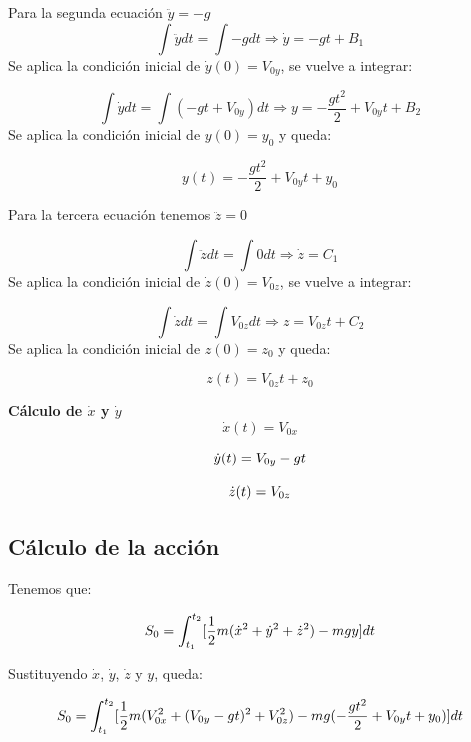 \documentclass{article}
\begin{document}
Para la segunda ecuación $\ddot{y}=-g$
\[
\int\ddot{y}dt=\int-gdt \Longrightarrow \dot{y}=-gt + B_1
\]
Se aplica la condición inicial de $\dot{y} (0)=V_{0y}$, se vuelve a integrar:

\[
\int \dot{y} dt = \int( -gt+ V_{0y}) dt \Longrightarrow y = -\frac{gt^2}{2} + V_{0y}t + B_2
\]
Se aplica la condición inicial de $y(0)=y_{0}$ y queda:

\begin{equation}
   y(t) = -\frac{gt^2}{2} + V_{0y}t + y_0
\end{equation}

Para la tercera ecuación tenemos $\ddot{z}=0$

\[
\int \ddot{z} dt = \int 0 dt \Longrightarrow \dot{z} = C_1
\]
Se aplica la condición inicial de $\dot{z} (0)=V_{0z}$, se vuelve a integrar:

\[
\int \dot{z} dt = \int V_{0z} dt \Longrightarrow z = V_{0z} t + C_2
\]
Se aplica la condición inicial de $z(0)=z_{0}$ y queda:

\begin{equation}
   z(t) = V_{0z} t + z_0
\end{equation}

\textbf{Cálculo de $\dot{x}$ y $\dot{y}$}
\begin{equation}
    \dot{x}(t)= V_{0x}
\end{equation}

\begin{equation}
\centering
    \dot{y}(t)= V_{0y} - gt
\end{equation}

\begin{equation}
\centering
    \dot{z}(t)= V_{0z}
\end{equation}

\subsection*{Cálculo de la acción}
Tenemos que:

\begin{equation}
\centering
    S_0= \int_{t_1}^{t_2} [\frac{1}{2}m( \dot{x}^2 + \dot{y}^2 + \dot{z}^2 ) - mgy]dt
\end{equation}

Sustituyendo $\dot{x}$, $\dot{y}$, $\dot{z}$ y $y$, queda:

\begin{equation}
\centering
     S_0= \int_{t_1}^{t_2} [\frac{1}{2}m( V_{0x}^2 + (V_{0y} - gt)^2 + V_{0z}^2) - mg(-\frac{gt^2}{2} + V_{0y}t + y_0)]dt
\end{equation}
\end{document}
